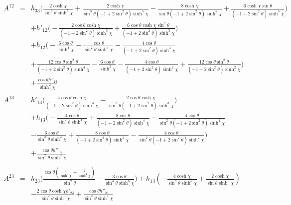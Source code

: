 \documentclass[10pt,letterpaper]{article}
\numberwithin{equation}{section}
\begin{document}
\begin{eqnarray}
\\  \nonumber\\ 
A^{12}&=& h_{33} \bigl(\frac{2 \cosh\chi}{\sin^3\theta \sinh^5\chi} + \frac{2 \cosh\chi}{\sin^3\theta (-1 + 2 \sin^2\theta) \sinh^5\chi} -  \frac{8 \cosh\chi}{\sin\theta (-1 + 2 \sin^2\theta) \sinh^5\chi} + \frac{6 \cosh\chi \sin\theta}{(-1 + 2 \sin^2\theta) \sinh^5\chi}\bigr) \nonumber \\ 
&& + h'_{12} \bigl(- \frac{2 \cos\theta \cosh\chi}{(-1 + 2 \sin^2\theta) \sinh^3\chi} + \frac{6 \cos\theta \cosh\chi \sin^2\theta}{(-1 + 2 \sin^2\theta) \sinh^3\chi}\bigr) \nonumber \\ 
&& + h_{12} \bigl(- \frac{6 \cos\theta}{\sinh^4\chi} -  \frac{\cos\theta}{\sin^2\theta \sinh^4\chi} -  \frac{4 \cos\theta}{(-1 + 2 \sin^2\theta) \sinh^4\chi} \nonumber\\
&& + \frac{12 \cos\theta \sin^2\theta}{(-1 + 2 \sin^2\theta) \sinh^4\chi} -  \frac{6 \cos\theta}{\sinh^2\chi} -  \frac{4 \cos\theta}{(-1 + 2 \sin^2\theta) \sinh^2\chi} + \frac{12 \cos\theta \sin^2\theta}{(-1 + 2 \sin^2\theta) \sinh^2\chi}\bigr) \nonumber \\ 
&& + \frac{\cos\theta h''_{12}}{\sinh^2\chi}
\\  \nonumber\\ 
A^{13}&=& h'_{13} \bigl(\frac{4 \cos\theta \cosh\chi}{(-1 + 2 \sin^2\theta) \sinh^3\chi} -  \frac{2 \cos\theta \cosh\chi}{\sin^2\theta (-1 + 2 \sin^2\theta) \sinh^3\chi}\bigr) \nonumber \\ 
&& + h_{13} \bigl(- \frac{4 \cos\theta}{\sin^2\theta \sinh^4\chi} + \frac{8 \cos\theta}{(-1 + 2 \sin^2\theta) \sinh^4\chi} -  \frac{4 \cos\theta}{\sin^2\theta (-1 + 2 \sin^2\theta) \sinh^4\chi} \nonumber\\
&& -  \frac{6 \cos\theta}{\sin^2\theta \sinh^2\chi} + \frac{8 \cos\theta}{(-1 + 2 \sin^2\theta) \sinh^2\chi} -  \frac{4 \cos\theta}{\sin^2\theta (-1 + 2 \sin^2\theta) \sinh^2\chi}\bigr) \nonumber \\ 
&& + \frac{\cos\theta h''_{13}}{\sin^2\theta \sinh^2\chi}
\\  \nonumber\\ 
A^{23}&=& h_{23} \bigl(\frac{\cos\theta (\frac{4}{\sinh^6\chi} -  \frac{2}{\sinh^4\chi})}{\sin^2\theta} -  \frac{3 \cos\theta}{\sin^4\theta \sinh^6\chi}\bigr) + h_{13} (- \frac{4 \cosh\chi}{\sin^3\theta \sinh^5\chi} + \frac{2 \cosh\chi}{\sin\theta \sinh^5\chi}) \nonumber \\ 
&& -  \frac{2 \cos\theta \cosh\chi h'_{23}}{\sin^2\theta \sinh^5\chi} + \frac{\cos\theta h''_{23}}{\sin^2\theta \sinh^4\chi}
\end{eqnarray}
%
%
%
\end{document}
